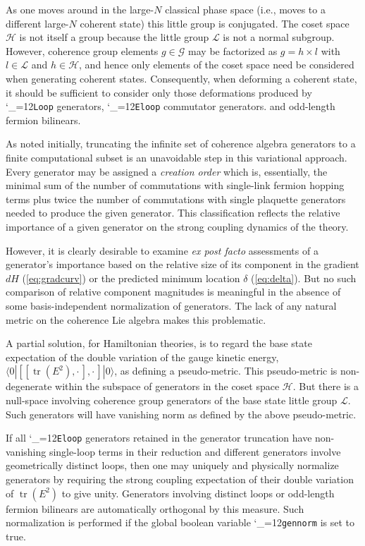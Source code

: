 \documentclass [12pt]{article}
\makeatletter
\renewcommand{\tt}{\begingroup\catcode`_=12\def\_{\string_}\tt@}
\newcommand{\tt@}[1]{\texttt{#1}\endgroup}
\newcommand{\tr}{\mathop{\mathrm{tr}}}
\makeatother
\begin{document}
As one moves around in the large-$N$ classical phase
space (i.e., moves to a different large-$N$ coherent state)
this little group is conjugated.
The coset space $\mathcal H$ is not itself a group
because the little group $\mathcal L$ is not a normal subgroup.
However, coherence group elements $g \in \mathcal G$
may be factorized as
$
    g = h \times l
$
with $l \in \mathcal L$ and $h \in \mathcal H$,
and hence only elements of the coset space need be considered
when generating coherent states.
Consequently, when deforming a coherent state,
it should be sufficient to consider only those
deformations produced by 
\tt{Loop} generators,
\tt{Eloop} commutator generators.
and odd-length fermion bilinears.

As noted initially, truncating the infinite set of
coherence algebra generators to a finite computational
subset is an unavoidable step in this variational approach.
Every generator may be assigned a \textit{creation order} which
is, essentially, the minimal sum of the number of
commutations with single-link fermion hopping 
terms plus twice the number of commutations with
single plaquette generators needed to produce the given
generator.
This classification reflects the relative importance of a
given generator on the strong coupling dynamics of the theory.

However, it is clearly desirable to examine
\textit{ex post facto} assessments of a generator's importance
based on the relative size of its component in the gradient $dH$
(\ref{eq:gradcurv}) or the predicted minimum location
$\delta$ (\ref{eq:delta}).
But no such comparison of relative component magnitudes
is meaningful in the absence of some basis-independent
normalization of generators.
The lack of any natural metric on
the coherence Lie algebra makes this problematic.

A partial solution, for Hamiltonian theories, is to
regard the base state expectation of
the double variation of the gauge kinetic energy,
$\langle 0 | [[\tr(E^2), \cdot \, ], \cdot \,  ]|0\rangle$,
as defining a pseudo-metric.
This pseudo-metric is non-degenerate within the subspace
of generators in the coset space $\mathcal H$.
%
But there is a null-space involving coherence group generators
of the base state little group $\mathcal L$.
Such generators will have vanishing norm as defined by the
above pseudo-metric.

If all \tt{Eloop} generators retained in the generator truncation
have non-vanishing single-loop terms in their reduction
and different generators involve geometrically distinct loops,
then one may uniquely and physically normalize
generators by requiring the strong coupling expectation of their
double variation of $\tr(E^2)$ to give unity.
Generators involving distinct loops or odd-length fermion bilinears are
automatically orthogonal by this measure.
Such normalization is performed if the global boolean variable
\tt{gennorm} is set to true.
\end{document}
